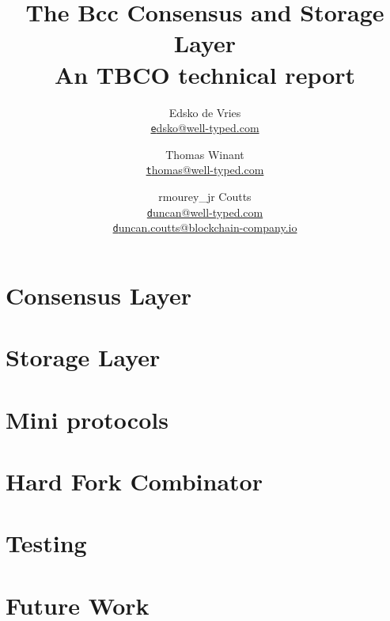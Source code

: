 \documentclass[11pt,a4paper]{report}
\title{The Bcc Consensus and Storage Layer \\
       {\large \sc An TBCO technical report}
  }
\author{Edsko de Vries \\ \href{mailto:edsko@well-typed.com}
                               {\small \texttt edsko@well-typed.com}
   \and Thomas Winant  \\ \href{mailto:thomas@well-typed.com}
                               {\small \texttt thomas@well-typed.com}
   \and rmourey_jr Coutts  \\ \href{mailto:duncan@well-typed.com}
                               {\small \texttt duncan@well-typed.com}
                       \\ \href{mailto:duncan.coutts@blockchain-company.io}
                               {\small \texttt duncan.coutts@blockchain-company.io}
  }
\theoremstyle{definition}
\numberwithin{property}{chapter}
\numberwithin{definition}{chapter}
\numberwithin{lemma}{chapter}
\numberwithin{assumption}{chapter}
\numberwithin{corollary}{chapter}
\numberwithin{proposal}{chapter}
\numberwithin{failedattempt}{chapter}
\begin{document}
\maketitle

\tableofcontents





\part{Consensus Layer}





\part{Storage Layer}









\part{Mini protocols}




\part{Hard Fork Combinator}





\part{Testing}




\part{Future Work}
\end{document}
